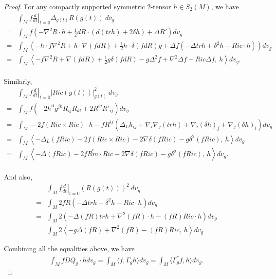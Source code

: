 \documentclass[12pt]{amsart}
\theoremstyle{definition}
\theoremstyle{remark}
\numberwithin{equation}{section}
\begin{document}
\begin{proof}
For any compactly supported symmetric 2-tensor $h \in S_2(M)$, we have
\begin{align*}
&\int_M f \left.\frac{d}{dt}\right|_{t=0}  {\Delta_{g(t)} R(g(t))}\ dv_g\\
=&\int_M f\left(- \nabla^2 R\cdot h + \frac{1}{2} dR \cdot (d( tr h ) + 2\delta h)+\Delta R'\right)dv_g\\
=&\int_M \left(-h \cdot f\nabla^2R+h \cdot \nabla(fdR) + \frac{1}{2}h \cdot \delta(fdR)g + \Delta f(-\Delta trh + \delta^2h-Ric\cdot h)\right)dv_g\\
=&\int_M  \left\langle-f\nabla^2R+\nabla(fdR) + \frac{1}{2}g\delta(fdR) -g\Delta^2f+\nabla^2\Delta f-Ric\Delta f,\ h\right\rangle dv_g.
\end{align*}\\

Similarly,
\begin{align*}
&\int_M f \left.\frac{d}{dt}\right|_{t=0} |Ric(g(t))|^2_{g(t)}\ dv_g\\
=&\int_M f\left(-2h^{il}g^{jk}R_{ij}R_{kl}+2R^{ij}{R'}_{ij}\right)dv_g\\
=&\int_M -2f(Ric\times Ric)\cdot h-fR^{ij}\left(\Delta_Lh_{ij} +\nabla_i\nabla_j(tr h)
+\nabla_i(\delta h)_j + \nabla_j(\delta h)_i\right) dv_g\\
=&\int_M \left\langle -\Delta_L (fRic)-2f(Ric\times Ric) - 2\nabla\delta(fRic) - g\delta^2(fRic),\ h \right\rangle dv_g\\
=&\int_M \left\langle-\Delta (fRic)-2f\overset\circ{Rm}\cdot Ric - 2\nabla\delta(fRic)-g\delta^2(fRic),\ h \right\rangle dv_g.
\end{align*}\\

And also,
\begin{align*}
&\int_M f \left.\frac{d}{dt}\right|_{t=0} (R(g(t)))^2 \ dv_g\\
=&\int_M 2 f R \left(-\Delta trh+\delta^2h-Ric\cdot h \right)dv_g\\
=&\int_M 2\left(-\Delta (fR)trh+\nabla^2(fR) \cdot h-(fR)Ric\cdot h\right)dv_g\\
=&\int_M 2 \left\langle -g\Delta (fR)+\nabla^2(fR)-(fR)Ric,\ h \right\rangle dv_g
\end{align*}

Combining all the equalities above, we have
\begin{align*}
\int_M f DQ_g \cdot hdv_g=\int_M \langle f,\Gamma_g h\rangle dv_g=\int_M \langle\Gamma_g^*f,h\rangle dv_g.
\end{align*}

\end{proof}
\end{document}
